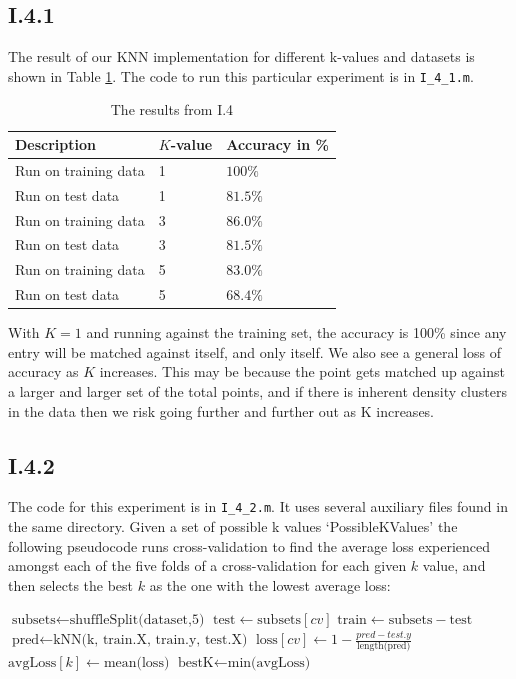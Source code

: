 \subsection{I.4.1}
The result of our KNN implementation for different k-values and datasets is
shown in Table \ref{tab:knn-res}. The code to run this particular experiment
is in \texttt{I\_4\_1.m}.
\begin{table}
\center
\begin{tabular}{|l|l|l|}
\hline
Description          & $K$-value & Accuracy in \% \\\hline
Run on training data & 1         & $100  \%$ \\
Run on test data     & 1         & $81.5 \%$ \\
Run on training data & 3         & $86.0 \%$ \\
Run on test data     & 3         & $81.5 \%$ \\
Run on training data & 5         & $83.0 \%$ \\
Run on test data     & 5         & $68.4 \%$ \\\hline
\end{tabular}
\caption{The results from I.4}
\label{tab:knn-res}
\end{table}

With $K=1$ and running against the training set, the accuracy is 100\% since any
entry will be matched against itself, and only itself. We also see a general
loss of accuracy as $K$ increases. This may be because the point gets matched up
against a larger and larger set of the total points, and if there is inherent density
clusters in the data then we risk going further and further out as K increases.

\subsection{I.4.2}
The code for this experiment is in \texttt{I\_4\_2.m}. It uses several auxiliary
files found in the same directory. Given a set of possible k values `PossibleKValues'
the following pseudocode runs cross-validation to find the average loss experienced amongst
each of the five folds of a cross-validation for each given $k$ value, and then selects the
best $k$ as the one with the lowest average loss:

\begin{algorithmic}
		\State $\text{subsets} \gets \text{shuffleSplit(dataset,5)}$
			\State $\text{test} \gets \text{subsets}[cv]$ 
			\State $\text{train} \gets \text{subsets} - \text{test}$ 
			\State $\text{pred} \gets \text{kNN(k, train.X, train.y, test.X)}$
			\State $\text{loss}[cv] \gets 1 - \frac{pred - test.y}{\text{length(pred)}}$
		\EndFor
		\State $\text{avgLoss}[k] \gets \text{mean(loss)}$
	\EndFor
	\State $\text{bestK} \gets \text{min(avgLoss)}$ 
\end{algorithmic}


